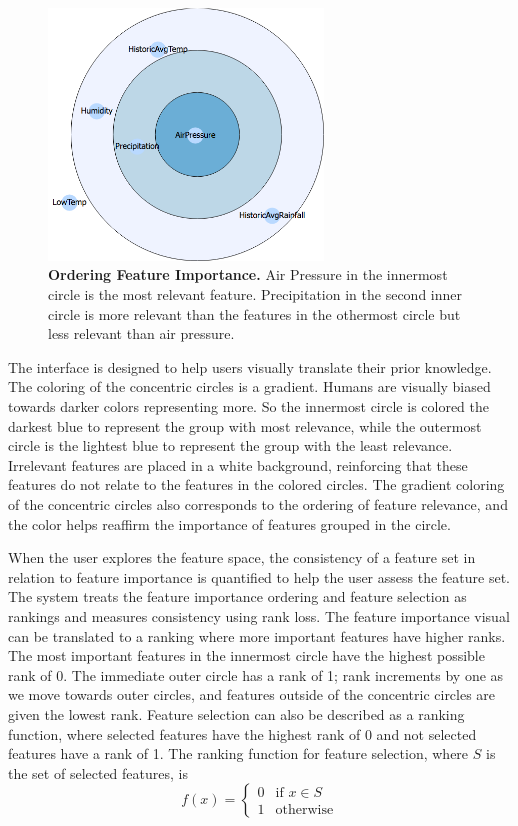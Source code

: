 \begin{figure}[!htbp]
\centering
\includegraphics[width=0.65\textwidth]{FeatureImportance3}
\caption{\textbf{Ordering Feature Importance.} Air Pressure in the innermost circle is the most relevant feature. Precipitation in the second inner circle is more relevant than the features in the othermost circle but less relevant than air pressure.} \label{fig:FeatureImportance3}
\end{figure}

The interface is designed to help users visually translate their prior knowledge. The coloring of the concentric circles is a gradient. Humans are visually biased towards darker colors representing more. So the innermost circle is colored the darkest blue to represent the group with most relevance, while the outermost circle is the lightest blue to represent the group with the least relevance. Irrelevant features are placed in a white background, reinforcing that these features do not relate to the features in the colored circles. The gradient coloring of the concentric circles also corresponds to the ordering of feature relevance, and the color helps reaffirm the importance of features grouped in the circle.

When the user explores the feature space, the consistency of a feature set in relation to feature importance is quantified to help the user assess the feature set. The system treats the feature importance ordering and feature selection as rankings and measures consistency using rank loss. The feature importance visual can be translated to a ranking where more important features have higher ranks. The most important features in the innermost circle have the highest possible rank of 0. The immediate outer circle has a rank of 1; rank increments by one as we move towards outer circles, and features outside of the concentric circles are given the lowest rank. Feature selection can also be described as a ranking function, where selected features have the highest rank of 0 and not selected features have a rank of 1. The ranking function for feature selection, where $S$ is the set of selected features, is 
\begin{equation}
  f(x) =
    \begin{cases}
      0 & \text{if $x \in S$}\\
      1 & \text{otherwise}
    \end{cases}       
\end{equation}

